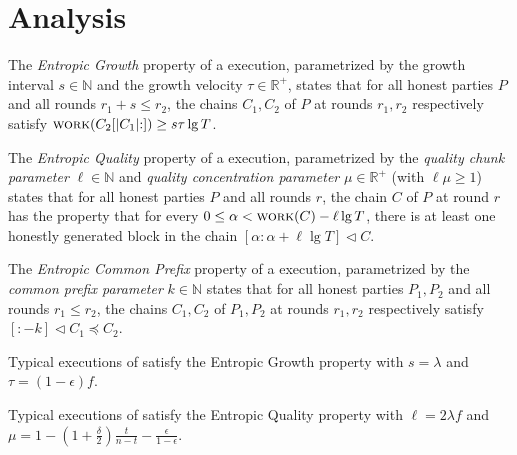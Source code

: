 \section{Analysis}

\begin{definition}
  The \emph{Entropic Growth} property of
  a \poem execution,
  parametrized by the growth interval $s \in \mathbb{N}$
  and the growth velocity $\tau \in \mathbb{R}^+$,
  states that for
  all honest parties $P$ and all rounds $r_1 + s \leq r_2$,
  the chains $C_1, C_2$ of $P$ at rounds $r_1, r_2$ respectively
  satisfy $\textsc{work}(C_2[{|C_1|}{:}]) \geq s \tau \lg T$.
\end{definition}

\begin{definition}
  The \emph{Entropic Quality} property of
  a \poem execution, parametrized by the \emph{quality chunk parameter} $\ell \in \mathbb{N}$
  and \emph{quality concentration parameter} $\mu \in \mathbb{R}^+$
  (with $\ell \mu \geq 1$)
  states that for
  all honest parties $P$ and all rounds $r$,
  the chain $C$ of $P$ at round $r$
  has the property that
  for every $0 \leq \alpha < \textsc{work}(C) - \ell \lg T$,
  there is at least one honestly generated block in the chain
  $[{\alpha}{:}{\alpha + \ell \lg T}] \lhd C$.
\end{definition}

\begin{definition}
  The \emph{Entropic Common Prefix} property of
  a \poem execution, parametrized by the \emph{common prefix parameter} $k \in \mathbb{N}$
  states that for
  all honest parties $P_1, P_2$
  and all rounds $r_1 \leq r_2$,
  the chains $C_1, C_2$ of $P_1, P_2$ at rounds $r_1, r_2$ respectively
  satisfy $[{:}{-k}] \lhd C_1 \preceq C_2$.
\end{definition}

\begin{theorem} 
  Typical executions of \poem satisfy the Entropic Growth property
  with $s = \lambda$ and $\tau = (1 - \epsilon)f$.
\end{theorem}

\begin{theorem} 
  Typical executions of \poem satisfy the Entropic Quality property
  with $\ell = 2 \lambda f$ and
  $\mu = 1 - (1 + \frac{\delta}{2})\frac{t}{n - t} - \frac{\epsilon}{1 - \epsilon}$.
\end{theorem}

